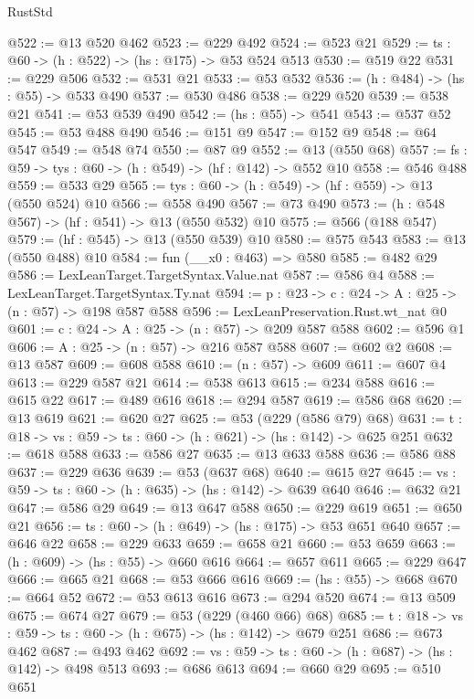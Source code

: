 \begin{lexlean}{RustStd}
\begin{coremodule}
@522 := @13 @520 @462
@523 := @229 @492
@524 := @523 @21
@529 := {ts : @60} -> (h : @522) -> (hs : @175) -> @53 @524 @513
@530 := @519 @22
@531 := @229 @506
@532 := @531 @21
@533 := @53 @532
@536 := (h : @484) -> (hs : @55) -> @533 @490
@537 := @530 @486
@538 := @229 @520
@539 := @538 @21
@541 := @53 @539 @490
@542 := (hs : @55) -> @541
@543 := @537 @52
@545 := @53 @488 @490
@546 := @151 @9
@547 := @152 @9
@548 := @64 @547
@549 := @548 @74
@550 := @87 @9
@552 := @13 (@550 @68)
@557 := {fs : @59} -> {tys : @60} -> (h : @549) -> (hf : @142) -> @552 @10
@558 := @546 @488
@559 := @533 @29
@565 := {tys : @60} -> (h : @549) -> (hf : @559) -> @13 (@550 @524) @10
@566 := @558 @490
@567 := @73 @490
@573 := (h : @548 @567) -> (hf : @541) -> @13 (@550 @532) @10
@575 := @566 (@188 @547)
@579 := (hf : @545) -> @13 (@550 @539) @10
@580 := @575 @543
@583 := @13 (@550 @488) @10
@584 := fun (__x0 : @463) => @580
@585 := @482 @29
@586 := LexLeanTarget.TargetSyntax.Value.nat
@587 := @586 @4
@588 := LexLeanTarget.TargetSyntax.Ty.nat
@594 := {p : @23} -> {c : @24} -> {A : @25} -> (n : @57) -> @198 @587 @588
@596 := LexLeanPreservation.Rust.wt_nat @0
@601 := {c : @24} -> {A : @25} -> (n : @57) -> @209 @587 @588
@602 := @596 @1
@606 := {A : @25} -> (n : @57) -> @216 @587 @588
@607 := @602 @2
@608 := @13 @587
@609 := @608 @588
@610 := (n : @57) -> @609
@611 := @607 @4
@613 := @229 @587 @21
@614 := @538 @613
@615 := @234 @588
@616 := @615 @22
@617 := @489 @616
@618 := @294 @587
@619 := @586 @68
@620 := @13 @619
@621 := @620 @27
@625 := @53 (@229 (@586 @79) @68)
@631 := {t : @18} -> {vs : @59} -> {ts : @60} -> (h : @621) -> (hs : @142) -> @625 @251
@632 := @618 @588
@633 := @586 @27
@635 := @13 @633 @588
@636 := @586 @88
@637 := @229 @636
@639 := @53 (@637 @68)
@640 := @615 @27
@645 := {vs : @59} -> {ts : @60} -> (h : @635) -> (hs : @142) -> @639 @640
@646 := @632 @21
@647 := @586 @29
@649 := @13 @647 @588
@650 := @229 @619
@651 := @650 @21
@656 := {ts : @60} -> (h : @649) -> (hs : @175) -> @53 @651 @640
@657 := @646 @22
@658 := @229 @633
@659 := @658 @21
@660 := @53 @659
@663 := (h : @609) -> (hs : @55) -> @660 @616
@664 := @657 @611
@665 := @229 @647
@666 := @665 @21
@668 := @53 @666 @616
@669 := (hs : @55) -> @668
@670 := @664 @52
@672 := @53 @613 @616
@673 := @294 @520
@674 := @13 @509
@675 := @674 @27
@679 := @53 (@229 (@460 @66) @68)
@685 := {t : @18} -> {vs : @59} -> {ts : @60} -> (h : @675) -> (hs : @142) -> @679 @251
@686 := @673 @462
@687 := @493 @462
@692 := {vs : @59} -> {ts : @60} -> (h : @687) -> (hs : @142) -> @498 @513
@693 := @686 @613
@694 := @660 @29
@695 := @510 @651

\end{coremodule}
\end{lexlean}
